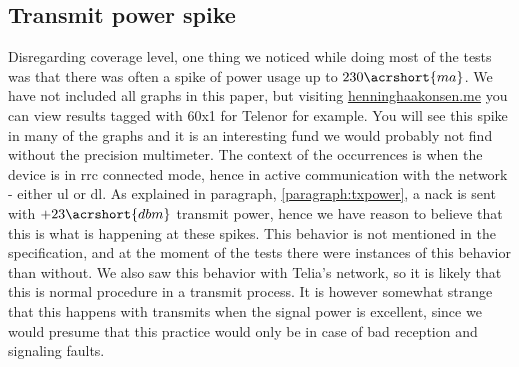 \documentclass[USenglish]{ifimaster}  %
\begin{document}
\subsection{Transmit power spike}
Disregarding coverage level, one thing we noticed while doing most of the tests was that there was often a spike of power usage up to ${230 \acrshort{ma}}$. We have not included all graphs in this paper, but visiting \url{henninghaakonsen.me} you can view results tagged with 60x1 for Telenor for example. You will see this spike in many of the graphs and it is an interesting fund we would probably not find without the precision multimeter. The context of the occurrences is when the device is in \acrshort{rrc} connected mode, hence in active communication with the network - either \acrshort{ul} or \acrshort{dl}. As explained in paragraph, \vref{paragraph:txpower}, a \acrshort{nack} is sent with ${+23 \acrshort{dbm}}$ transmit power, hence we have reason to believe that this is what is happening at these spikes. This behavior is not mentioned in the specification, and at the moment of the tests there were instances of this behavior than without. We also saw this behavior with Telia's network, so it is likely that this is normal procedure in a transmit process. It is however somewhat strange that this happens with transmits when the signal power is excellent, since we would presume that this practice would only be in case of bad reception and signaling faults.
\end{document}

